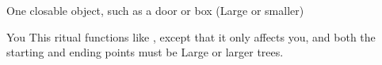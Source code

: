 \begin{spelltarget}{One closable object, such as a door or box (Large or smaller)}
\begin{spelltarget}{You}
\spelleffect This ritual functions like , except that it only affects you, and both the starting and ending points must be Large or larger trees.
\begin{comment}
You gain the ability to enter trees and move from inside one tree to inside another tree. The first tree you enter and all others you enter must be of the same kind, must be living, and must have girth at least equal to yours. By moving into an oak tree (for example), you instantly know the location of all other oak trees within transport range (see below) and may choose whether you want to pass into one or simply step back out of the tree you moved into. You may choose to pass to any tree of the appropriate kind within the transport range as shown on the following table.
\begin{dtable}
    \begin{tabularx}{\columnwidth}{>{\lcol}X >{\lcol}X}
        Type of Tree & Transport Range \\
        Oak, ash, yew & 3,000 feet \\
        Elm, linden & 2,000 feet \\
        Other deciduous & 1,500 feet \\
        Any coniferous & 1,000 feet \\
        All other trees & 500 feet
    \end{tabularx}
\end{dtable}
\par You may move into a tree up to one time per caster level (passing from one tree to another counts only as moving into one tree). The spell lasts until the duration expires or you exit a tree. Each transport is a full-round action.
\par You can, at your option, remain within a tree without transporting yourself, but you are forced out when the spell ends. If the tree in which you are concealed is chopped down or burned, you are slain if you do not exit before the process is complete.
\end{comment}


\end{spelltarget}
\end{spelltarget}
